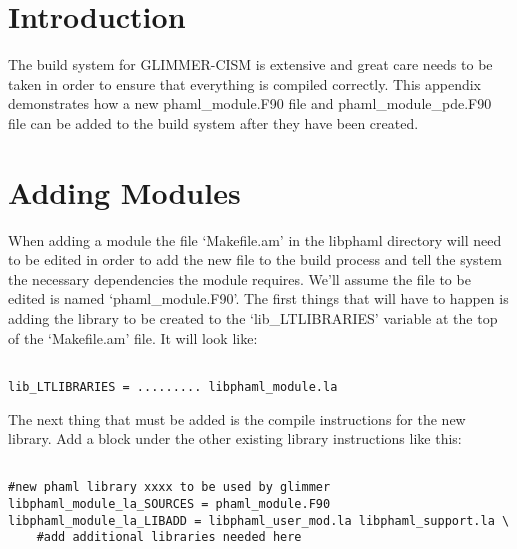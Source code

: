 \section{Introduction}\label{sec:addintro}

The build system for GLIMMER-CISM is extensive and great care needs to be taken in order to ensure that everything is compiled correctly.  This appendix demonstrates how a new phaml\_module.F90 file and phaml\_module\_pde.F90 file can be added to the build system after they have been created.

\section{Adding Modules}\label{sec:addmod}

When adding a module the file `Makefile.am' in the libphaml directory will need to be edited in order to add the new file to the build process and tell the system the necessary dependencies the module requires.  We'll assume the file to be edited is named `phaml\_module.F90'.  The first things that will have to happen is adding the library to be created to the `lib\_LTLIBRARIES' variable at the top of the `Makefile.am' file.  It will look like:

\begin{framecode}{6in}
\begin{verbatim}

lib_LTLIBRARIES = ......... libphaml_module.la

\end{verbatim}
\end{framecode}

The next thing that must be added is the compile instructions for the new library.  Add a block under the other existing library instructions like this:

\begin{framecode}{6in}
\begin{verbatim}

#new phaml library xxxx to be used by glimmer
libphaml_module_la_SOURCES = phaml_module.F90 
libphaml_module_la_LIBADD = libphaml_user_mod.la libphaml_support.la \
    #add additional libraries needed here

\end{verbatim}
\end{framecode}

